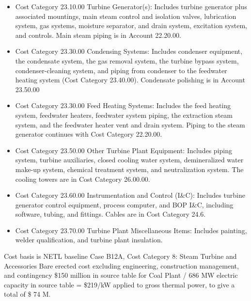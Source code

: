 \begin{itemize}
    \item Cost Category 23.10.00 Turbine Generator(s): Includes turbine generator plus associated mountings, main steam control and isolation valves, lubrication system, gas systems, moisture separator, and drain system, excitation system, and controls. Main steam piping is in Account 22.20.00.
    \item Cost Category 23.30.00 Condensing Systems: Includes condenser equipment, the condensate system, the gas removal system, the turbine bypass system, condenser-cleaning system, and piping from condenser to the feedwater heating system (Cost Category 23.40.00). Condensate polishing is in Account 23.50.00
    \item Cost Category 23.30.00 Feed Heating Systems: Includes the feed heating system, feedwater heaters, feedwater system piping, the extraction steam system, and the feedwater heater vent and drain system. Piping to the steam generator continues with Cost Category 22.20.00.
    \item Cost Category 23.50.00 Other Turbine Plant Equipment: Includes piping system, turbine auxiliaries, closed cooling water system, demineralized water make-up system, chemical treatment system, and neutralization system. The cooling towers are in Cost Category 26.00.00.
    \item Cost Category 23.60.00 Instrumentation and Control (I\&C): Includes turbine generator control equipment, process computer, and BOP I\&C, including software, tubing, and fittings. Cables are in Cost Category 24.6.
    \item Cost Category 23.70.00 Turbine Plant Miscellaneous Items: Includes painting, welder qualification, and turbine plant insulation.
\end{itemize}

Cost basis is NETL baseline Case B12A, Cost Category 8: Steam Turbine and Accessories Bare erected cost excluding engineering, construction management, and contingency \$150 million in source table for Coal Plant / 686 MW electric capacity in source table = \$219/kW applied to gross thermal power, to give a total of \$ 74 M.